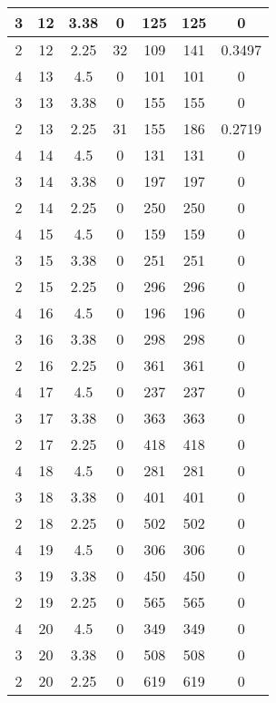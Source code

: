 \documentclass[letterpaper, 12pt]{article}
\begin{document}
\begin{longtable}{|c|c|c|c|c|c|c|}
\hline
3 & 12 & 3.38 & 0 & 125 & 125 & 0 \\
\hline
2 & 12 & 2.25 & 32 & 109 & 141 & 0.3497 \\
\hline
4 & 13 & 4.5 & 0 & 101 & 101 & 0 \\
\hline
3 & 13 & 3.38 & 0 & 155 & 155 & 0 \\
\hline
2 & 13 & 2.25 & 31 & 155 & 186 & 0.2719 \\
\hline
4 & 14 & 4.5 & 0 & 131 & 131 & 0 \\
\hline
3 & 14 & 3.38 & 0 & 197 & 197 & 0 \\
\hline
2 & 14 & 2.25 & 0 & 250 & 250 & 0 \\
\hline
4 & 15 & 4.5 & 0 & 159 & 159 & 0 \\
\hline
3 & 15 & 3.38 & 0 & 251 & 251 & 0 \\
\hline
2 & 15 & 2.25 & 0 & 296 & 296 & 0 \\
\hline
4 & 16 & 4.5 & 0 & 196 & 196 & 0 \\
\hline
3 & 16 & 3.38 & 0 & 298 & 298 & 0 \\
\hline
2 & 16 & 2.25 & 0 & 361 & 361 & 0 \\
\hline
4 & 17 & 4.5 & 0 & 237 & 237 & 0 \\
\hline
3 & 17 & 3.38 & 0 & 363 & 363 & 0 \\
\hline
2 & 17 & 2.25 & 0 & 418 & 418 & 0 \\
\hline
4 & 18 & 4.5 & 0 & 281 & 281 & 0 \\
\hline
3 & 18 & 3.38 & 0 & 401 & 401 & 0 \\
\hline
2 & 18 & 2.25 & 0 & 502 & 502 & 0 \\
\hline
4 & 19 & 4.5 & 0 & 306 & 306 & 0 \\
\hline
3 & 19 & 3.38 & 0 & 450 & 450 & 0 \\
\hline
2 & 19 & 2.25 & 0 & 565 & 565 & 0 \\
\hline
4 & 20 & 4.5 & 0 & 349 & 349 & 0 \\
\hline
3 & 20 & 3.38 & 0 & 508 & 508 & 0 \\
\hline
2 & 20 & 2.25 & 0 & 619 & 619 & 0 \\
\hline
\end{longtable}
\end{document}

